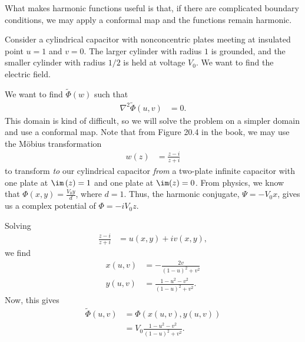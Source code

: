 \documentclass[10pt]{mypackage}
\begin{document}
What makes harmonic functions useful is that, if there are complicated boundary conditions, we may apply a conformal map and the functions remain harmonic.
\begin{example}
  Consider a cylindrical capacitor with nonconcentric plates meeting at insulated point $u = 1$ and $v = 0$. The larger cylinder with radius $1$ is grounded, and the smaller cylinder with radius $1/2$ is held at voltage $V_0$. We want to find the electric field.\newline

  We want to find $\widetilde{\Phi}(w)$ such that
  \begin{align*}
    \nabla^2\widetilde{\Phi}\left( u,v \right) &= 0.
  \end{align*}
  This domain is kind of difficult, so we will solve the problem on a simpler domain and use a conformal map. Note that from Figure 20.4 in the book, we may use the Möbius transformation
  \begin{align*}
    w(z) &= \frac{z-i}{z+i}
  \end{align*}
  to transform \textit{to} our cylindrical capacitor \textit{from} a two-plate infinite capacitor with one plate at $\im\left( z \right) = 1$ and one plate at $\im(z) = 0$. From physics, we know that $\Phi\left( x,y \right) = \frac{V_0y}{d}$, where $d = 1$. Thus, the harmonic conjugate, $\Psi = -V_0 x$, gives us a complex potential of $\Phi = -iV_0 z$.\newline
  
  Solving
  \begin{align*}
    \frac{z-i}{z+i} &= u\left( x,y \right) + iv\left( x,y \right),
  \end{align*}
  we find
  \begin{align*}
    x\left( u,v \right) &= -\frac{2v}{\left( 1-u \right)^2 + v^2}\\
    y\left( u,v \right) &= \frac{1-u^2-v^2}{\left( 1-u \right)^2 + v^2}.
  \end{align*}
  Now, this gives
  \begin{align*}
    \widetilde{\Phi}\left( u,v \right) &= \Phi\left( x\left( u,v \right),y\left( u,v \right) \right)\\
                                       &= V_0 \frac{1-u^2-v^2}{\left( 1-u \right)^2 + v^2}.
  \end{align*}
\end{example}
\end{document}
